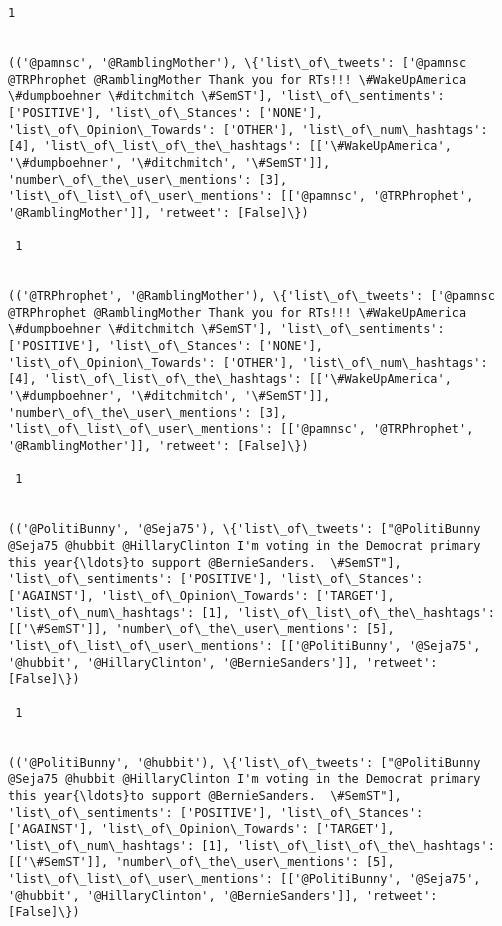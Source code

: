 \documentclass[11pt]{article}
\begin{document}
\begin{Verbatim}[commandchars=\\\{\}]
 1
 

(('@pamnsc', '@RamblingMother'), \{'list\_of\_tweets': ['@pamnsc @TRPhrophet @RamblingMother Thank you for RTs!!! \#WakeUpAmerica \#dumpboehner \#ditchmitch \#SemST'], 'list\_of\_sentiments': ['POSITIVE'], 'list\_of\_Stances': ['NONE'], 'list\_of\_Opinion\_Towards': ['OTHER'], 'list\_of\_num\_hashtags': [4], 'list\_of\_list\_of\_the\_hashtags': [['\#WakeUpAmerica', '\#dumpboehner', '\#ditchmitch', '\#SemST']], 'number\_of\_the\_user\_mentions': [3], 'list\_of\_list\_of\_user\_mentions': [['@pamnsc', '@TRPhrophet', '@RamblingMother']], 'retweet': [False]\})

 1
 

(('@TRPhrophet', '@RamblingMother'), \{'list\_of\_tweets': ['@pamnsc @TRPhrophet @RamblingMother Thank you for RTs!!! \#WakeUpAmerica \#dumpboehner \#ditchmitch \#SemST'], 'list\_of\_sentiments': ['POSITIVE'], 'list\_of\_Stances': ['NONE'], 'list\_of\_Opinion\_Towards': ['OTHER'], 'list\_of\_num\_hashtags': [4], 'list\_of\_list\_of\_the\_hashtags': [['\#WakeUpAmerica', '\#dumpboehner', '\#ditchmitch', '\#SemST']], 'number\_of\_the\_user\_mentions': [3], 'list\_of\_list\_of\_user\_mentions': [['@pamnsc', '@TRPhrophet', '@RamblingMother']], 'retweet': [False]\})

 1
 

(('@PolitiBunny', '@Seja75'), \{'list\_of\_tweets': ["@PolitiBunny @Seja75 @hubbit @HillaryClinton I'm voting in the Democrat primary this year{\ldots}to support @BernieSanders.  \#SemST"], 'list\_of\_sentiments': ['POSITIVE'], 'list\_of\_Stances': ['AGAINST'], 'list\_of\_Opinion\_Towards': ['TARGET'], 'list\_of\_num\_hashtags': [1], 'list\_of\_list\_of\_the\_hashtags': [['\#SemST']], 'number\_of\_the\_user\_mentions': [5], 'list\_of\_list\_of\_user\_mentions': [['@PolitiBunny', '@Seja75', '@hubbit', '@HillaryClinton', '@BernieSanders']], 'retweet': [False]\})

 1
 

(('@PolitiBunny', '@hubbit'), \{'list\_of\_tweets': ["@PolitiBunny @Seja75 @hubbit @HillaryClinton I'm voting in the Democrat primary this year{\ldots}to support @BernieSanders.  \#SemST"], 'list\_of\_sentiments': ['POSITIVE'], 'list\_of\_Stances': ['AGAINST'], 'list\_of\_Opinion\_Towards': ['TARGET'], 'list\_of\_num\_hashtags': [1], 'list\_of\_list\_of\_the\_hashtags': [['\#SemST']], 'number\_of\_the\_user\_mentions': [5], 'list\_of\_list\_of\_user\_mentions': [['@PolitiBunny', '@Seja75', '@hubbit', '@HillaryClinton', '@BernieSanders']], 'retweet': [False]\})


\end{Verbatim}
\end{document}

